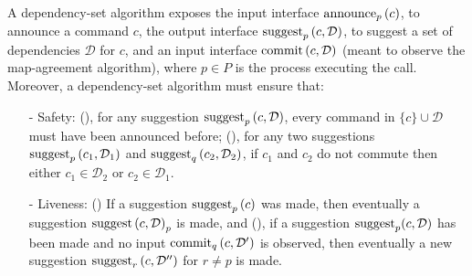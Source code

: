 A dependency-set algorithm exposes the input interface $\operatorname{announce}_p\left( c \right)$, to announce a command $c$, the output interface $\operatorname{suggest}_p \left( c,\mathcal{D}\right)$, to suggest a set of dependencies $\mathcal{D}$ for $c$, and an input interface $\operatorname{commit}\left( c,\mathcal{D} \right)$ (meant to observe the map-agreement algorithm), where $p\in P$ is the process executing the call.
Moreover, a dependency-set algorithm must ensure that:
\begin{itemize}[noitemsep,nolistsep]
    \item[-] Safety: (), for any suggestion $\operatorname{suggest}_p \left( c,\mathcal{D}\right)$, every command in $\{c\}\cup \mathcal{D}$ must have been announced before; (), for any two suggestions $\operatorname{suggest}_p \left( c_1,\mathcal{D}_1\right)$ and $\operatorname{suggest}_q \left( c_2,\mathcal{D}_2\right)$, if $c_1$ and $c_2$ do not commute then either $c_1\in \mathcal{D}_2$ or $c_2 \in \mathcal{D}_1$.
    \item[-] Liveness: () If a suggestion $\operatorname{suggest}_p\left( c \right)$ was made, then eventually a suggestion $\operatorname{suggest}\left( c,\mathcal{D} \right)_p$ is made, and (), if a suggestion $\operatorname{suggest}_p(c,\mathcal{D})$ has been made and no input $\operatorname{commit}_q\left( c,\mathcal{D'} \right)$ is observed, then eventually a new suggestion $\operatorname{suggest}_r\left( c,\mathcal{D''} \right)$ for $r\neq p$ is made.
\end{itemize}

